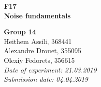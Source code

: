 


  
\begin{titlepage}
  \thispagestyle{empty}
  
%
%
%
  
  \hspace{0pt}
  \vspace{2cm}
  \begin{center}
    \hdashrule{\linewidth}{1pt}{}
    \vskip -0.5cm
    \hdashrule{\linewidth}{0.5pt}{}
    
    \vspace{0.5cm}
    \Huge{ \textbf{F17 \\}}
    \LARGE{ \textbf{Noise fundamentals} } 
    
    \hdashrule{\linewidth}{0.5pt}{}
    \vskip -0.95cm
    \hdashrule{\linewidth}{1pt}{}
    
    \vspace{3cm}
    \Large{\textbf{ Group 14 \\}}
    \Large{Heithem Assili, 368441 \\ Alexandre Drouet, 355095 \\ Olexiy Fedorets, 356615 \\}
    \vspace{1cm}
    \Large{\textsl{ Date of experiment: 21.03.2019 \\ Submission date: 04.04.2019}}
    
  \end{center}
  \vfill
  
\end{titlepage}
  
  
  
{}
\thispagestyle{plain}

